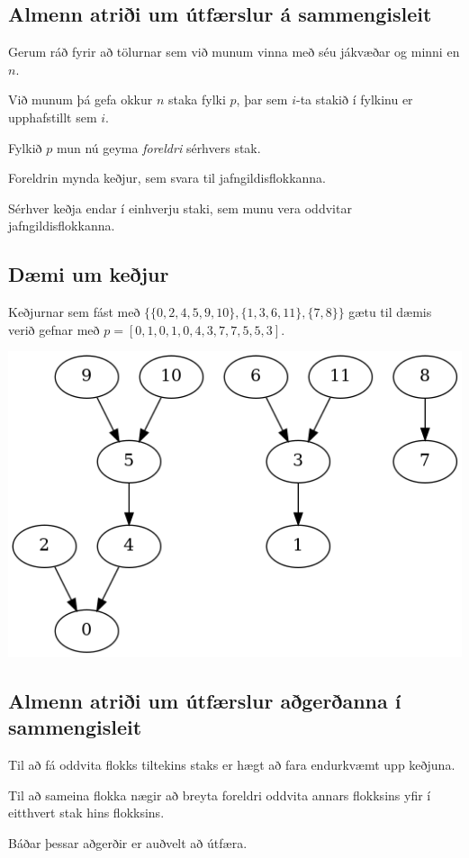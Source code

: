 \subsection{Almenn atriði um útfærslur á sammengisleit}
{
	{
		\item<1-> Gerum ráð fyrir að tölurnar sem við munum vinna með séu jákvæðar og minni en $n$.
		\item<2-> Við munum þá gefa okkur $n$ staka fylki $p$, þar sem $i$-ta stakið í fylkinu er upphafstillt sem $i$.
		\item<3-> Fylkið $p$ mun nú geyma \emph{foreldri} sérhvers stak.
		\item<4-> Foreldrin mynda keðjur, sem svara til jafngildisflokkanna.
		\item<5-> Sérhver keðja endar í einhverju staki, sem munu vera oddvitar jafngildisflokkanna.
	}
}

\subsection{Dæmi um keðjur}
{
	{
		\item<1-> Keðjurnar sem fást með $\{\{0, 2, 4, 5, 9, 10\}, \{1, 3, 6, 11\}, \{7, 8\}\}$ gætu til dæmis verið gefnar með
					$p = [0, 1, 0, 1, 0, 4, 3, 7, 7, 5, 5, 3]$.
		\item<2->[] \includegraphics[scale=0.5]{fig/mynd.png}
	}
}

\subsection{Almenn atriði um útfærslur aðgerðanna í sammengisleit}
{
	{
		\item<1-> Til að fá oddvita flokks tiltekins staks er hægt að fara endurkvæmt upp keðjuna.
		\item<2-> Til að sameina flokka nægir að breyta foreldri oddvita annars flokksins yfir í
			eitthvert stak hins flokksins.
		\item<3-> Báðar þessar aðgerðir er auðvelt að útfæra.
	}
}

